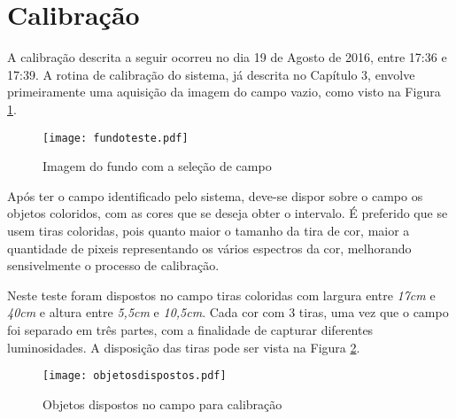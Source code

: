 \section{Calibração}
A calibração descrita a seguir ocorreu no dia 19 de Agosto de 2016, entre 17:36 e 17:39.
A rotina de calibração do sistema, já descrita no Capítulo 3, envolve primeiramente uma aquisição da imagem do campo vazio, como visto na Figura \ref{campovazio}.
\begin{figure}[H]
		\centering
		\texttt{[image: fundoteste.pdf]}
		\caption{Imagem do fundo com a seleção de campo}
		\label{campovazio}
	\end{figure}
	
Após ter o campo identificado pelo sistema, deve-se dispor sobre o campo os objetos coloridos, com as cores que se deseja obter o intervalo. É preferido que se usem tiras coloridas, pois quanto maior o tamanho da tira de cor, maior a quantidade de pixeis representando os vários espectros da cor, melhorando sensivelmente o processo de calibração.

Neste teste foram dispostos no campo tiras coloridas com largura entre \textit{17cm} e \textit{40cm} e altura entre \textit{5,5cm} e \textit{10,5cm}. Cada cor com 3 tiras, uma vez que o campo foi separado em três partes, com a finalidade de capturar diferentes luminosidades. A disposição das tiras pode ser vista na Figura \ref{fig:objetodispostos}.
	
	\begin{figure}[H]
\centering
\texttt{[image: objetosdispostos.pdf]}
\caption{Objetos dispostos no campo para calibração}
\label{fig:objetodispostos}
\end{figure}	
	
